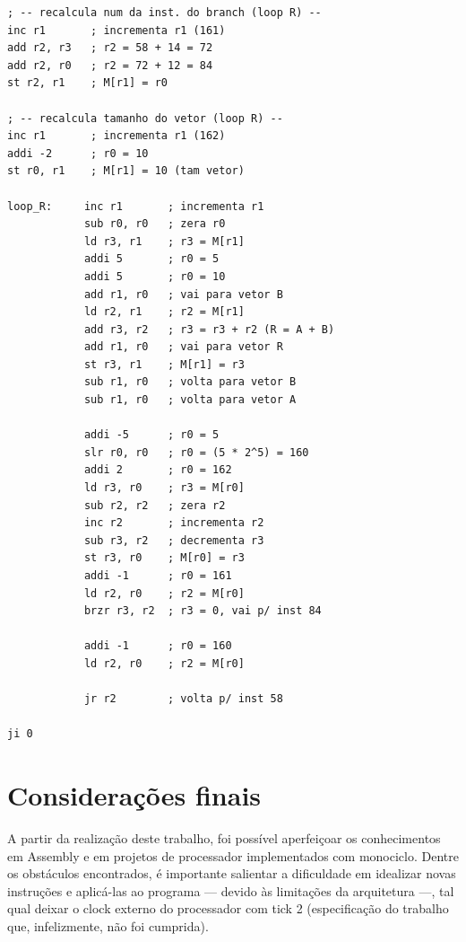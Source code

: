 \documentclass[twocolumn, 11pt]{article}
\begin{document}
\begin{lstlisting}
; -- recalcula num da inst. do branch (loop R) --
inc r1       ; incrementa r1 (161)
add r2, r3   ; r2 = 58 + 14 = 72
add r2, r0   ; r2 = 72 + 12 = 84
st r2, r1    ; M[r1] = r0

; -- recalcula tamanho do vetor (loop R) --
inc r1       ; incrementa r1 (162)
addi -2      ; r0 = 10
st r0, r1    ; M[r1] = 10 (tam vetor)

loop_R:     inc r1       ; incrementa r1
            sub r0, r0   ; zera r0
            ld r3, r1    ; r3 = M[r1]
            addi 5       ; r0 = 5
            addi 5       ; r0 = 10
            add r1, r0   ; vai para vetor B
            ld r2, r1    ; r2 = M[r1]
            add r3, r2   ; r3 = r3 + r2 (R = A + B)
            add r1, r0   ; vai para vetor R
            st r3, r1    ; M[r1] = r3
            sub r1, r0   ; volta para vetor B
            sub r1, r0   ; volta para vetor A

            addi -5      ; r0 = 5
            slr r0, r0   ; r0 = (5 * 2^5) = 160
            addi 2       ; r0 = 162
            ld r3, r0    ; r3 = M[r0]
            sub r2, r2   ; zera r2
            inc r2       ; incrementa r2
            sub r3, r2   ; decrementa r3
            st r3, r0    ; M[r0] = r3
            addi -1      ; r0 = 161
            ld r2, r0    ; r2 = M[r0]
            brzr r3, r2  ; r3 = 0, vai p/ inst 84

            addi -1      ; r0 = 160
            ld r2, r0    ; r2 = M[r0]

            jr r2        ; volta p/ inst 58

ji 0
\end{lstlisting}

\section{Considerações finais}

A partir da realização deste trabalho, foi possível aperfeiçoar os conhecimentos em Assembly e em projetos de processador implementados com monociclo. Dentre os obstáculos encontrados, é importante salientar a dificuldade em idealizar novas instruções e aplicá-las ao programa — devido às limitações da arquitetura —, tal qual deixar o clock externo do processador com tick 2 (especificação do trabalho que, infelizmente, não foi cumprida).
\end{document}
